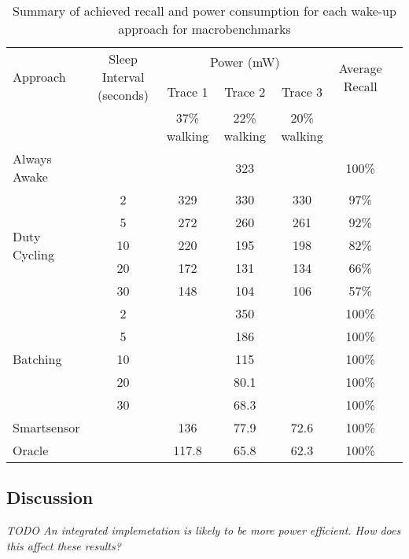 \begin{table*}[t]
\centering
    \begin{tabular}{|l|c|c|c|c|c|c|}
    \hline
	\multirow{2}{*}{Approach}		& \multirow{2}{*}{\parbox{2.2cm}{Sleep Interval (seconds)}}
												& \multicolumn{3}{c|}{\parbox{1.2cm}{Power (mW)}}
																								& \multirow{2}{*}{\parbox{1.5cm}{Average Recall}} \\ \cline{3-5}
									&			& Trace 1		& Trace 2		& Trace 3 		& 							\\ 
									&			& 37\% walking	& 22\% walking		& 20\% walking		& \\ \hline
	Always Awake					& 			& \multicolumn{3}{c|}{323} 						& 100\% \\ \hline
	\multirow{5}{*}{Duty Cycling}	& 2			& 329			& 330			& 330			& 97\%	\\ \cline{2-6}
									& 5			& 272			& 260			& 261			& 92\%	\\ \cline{2-6}
									& 10		& 220			& 195			& 198			& 82\%	\\ \cline{2-6}
									& 20		& 172			& 131			& 134			& 66\%	\\ \cline{2-6}
									& 30		& 148			& 104			& 106			& 57\%	\\ \hline
	\multirow{5}{*}{Batching}		& 2			& \multicolumn{3}{c|}{350} 						& 100\% \\ \cline{2-6}
									& 5			& \multicolumn{3}{c|}{186} 						& 100\% \\ \cline{2-6}
	 								& 10		& \multicolumn{3}{c|}{115} 						& 100\% \\ \cline{2-6}
	 								& 20		& \multicolumn{3}{c|}{80.1} 					& 100\% \\ \cline{2-6}
	 								& 30		& \multicolumn{3}{c|}{68.3} 					& 100\% \\ \hline
	Smartsensor				&			& 136			& 77.9			& 72.6			& 100\% \\ \hline
	Oracle				&			& 117.8			& 65.8			& 62.3			& 100\% \\ \hline



    \end{tabular}
	\caption{Summary of achieved recall and power consumption for each wake-up approach for macrobenchmarks}
	\label{table:macrobenchmarks}
\end{table*}

\subsection{Discussion}

{\em TODO An integrated implemetation is likely to be more power
  efficient. How does this affect these results?}

